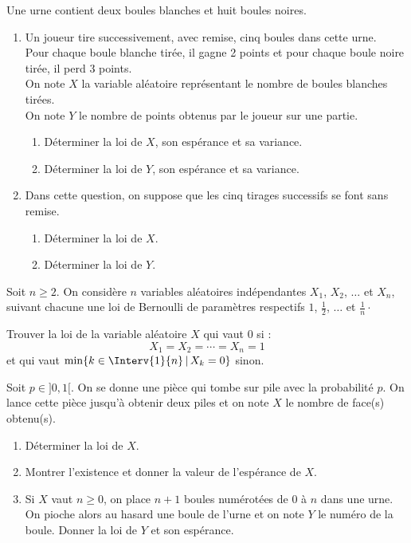 \documentclass[a4paper,10pt]{report}
\begin{document}
\begin{Exa} Une urne contient deux boules blanches et huit boules noires.
\begin{enumerate}
\item
Un joueur tire successivement, avec remise,  cinq boules dans cette urne.\\
Pour chaque boule blanche tirée, il gagne 2 points et pour chaque boule noire tirée, il perd 3 points.\\
On note $X$ la variable aléatoire représentant le nombre de boules blanches tirées.\\
On note $Y$ le nombre de points obtenus par le joueur sur une partie.
\begin{enumerate}
\item
Déterminer la loi de $X$, son espérance et sa variance.
\item
Déterminer la loi de $Y$, son espérance et sa variance.
\end{enumerate}
\item
Dans cette question, on suppose que les cinq tirages successifs se font sans remise.
\begin{enumerate}
\item 
Déterminer la loi de $X$.
\item
Déterminer la loi de $Y$.
\end{enumerate}
\end{enumerate}
\end{Exa}




\begin{Exa} Soit $n \geq 2$. On considère $n$ variables aléatoires indépendantes $X_1$, $X_2$, $\ldots$ et $X_n$, suivant chacune une loi de Bernoulli de paramètres respectifs $1$, $\tfrac{1}{2}$, $\ldots$ et $\tfrac{1}{n}\cdot$

\noindent Trouver la loi de la variable aléatoire $X$ qui vaut $0$ si :
$$ X_1= X_2= \cdots = X_n = 1$$
et qui vaut $\min \lbrace k \in \Interv{1}{n} \, \vert \, X_k =0 \rbrace$ sinon.
\end{Exa} 

\begin{Exa} Soit $p \in ]0,1[$. On se donne une pièce qui tombe sur pile avec la probabilité $p$. On lance cette pièce jusqu'à obtenir deux piles et on note $X$ le nombre de face(s) obtenu(s).

\begin{enumerate}
\item Déterminer la loi de $X$.
\item Montrer l'existence et donner la valeur de l'espérance de $X$.
\item Si $X$ vaut $n \geq 0$, on place $n+1$ boules numérotées de $0$ à $n$ dans une urne. On pioche alors au hasard une boule de l'urne et on note $Y$ le numéro de la boule. Donner la loi de $Y$ et son espérance.
\end{enumerate}   
\end{Exa}
\end{document}
